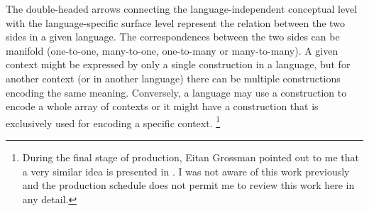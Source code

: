 The double-headed arrows connecting the language-independent conceptual level with the language-specific surface level represent the relation between the two sides in a given language. The correspondences between the two sides can be manifold (one-to-one, many-to-one, one-to-many or many-to-many). 
A given context might be expressed by only a single construction in a language, but for another context (or in another language) there can be multiple constructions encoding the same meaning. 
Conversely, a language may use a construction to encode a whole array of contexts or it might have a construction that is exclusively used for encoding a specific context. 
\footnote{During the final stage of production, Eitan Grossman pointed out to me that a very similar idea is presented in \citet{Frajzyngier:2003}. 
I was not aware of this work previously and the production schedule does not permit me to review this work here in any detail. }%

